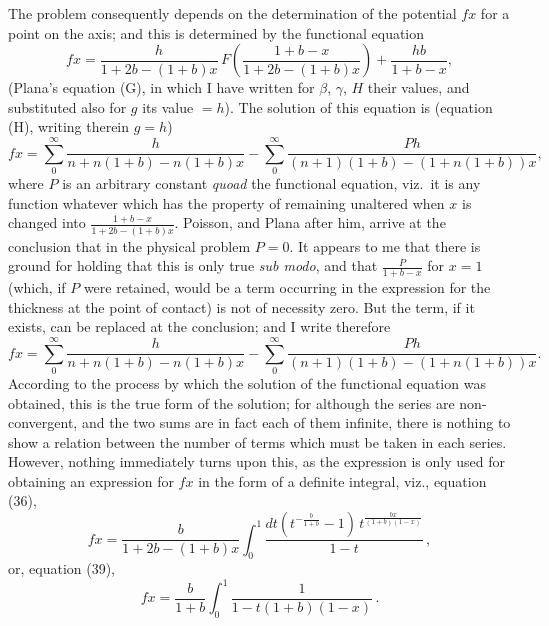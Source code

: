 \documentclass[11pt,a4paper]{article}
\begin{document}
The problem consequently depends on the determination of the potential $fx$ for a point on the axis; and this is determined by the functional equation
\[
fx = \frac{h}{1 + 2b - (1+b)x}\, F\!\left(\frac{1 + b - x}{1 + 2b - (1+b)x}\right) + \frac{hb}{1+b-x},
\]
(Plana's equation (G), in which I have written for $\beta$, $\gamma$, $H$ their values, and substituted also for $g$ its value $= h$). The solution of this equation is (equation (H), writing therein $g = h$)
\[
fx = \sum_{0}^{\infty}\frac{h}{n + n(1+b) - n(1+b)x} - \sum_{0}^{\infty}\frac{Ph}{(n+1)(1+b) - (1 + n(1+b))x},
\]
where $P$ is an arbitrary constant \textit{quoad} the functional equation, viz.\ it is any function whatever which has the property of remaining unaltered when $x$ is changed into $\frac{1+b-x}{1+2b-(1+b)x}$. Poisson, and Plana after him, arrive at the conclusion that in the physical problem $P = 0$. It appears to me that there is ground for holding that this is only true \textit{sub modo}, and that $\frac{P}{1+b-x}$ for $x = 1$ (which, if $P$ were retained, would be a term occurring in the expression for the thickness at the point of contact) is not of necessity zero. But the term, if it exists, can be replaced at the conclusion; and I write therefore
\[
fx = \sum_{0}^{\infty}\frac{h}{n + n(1+b) - n(1+b)x} - \sum_{0}^{\infty}\frac{Ph}{(n+1)(1+b) - (1 + n(1+b))x}.
\]
According to the process by which the solution of the functional equation was obtained, this is the true form of the solution; for although the series are non-convergent, and the two sums are in fact each of them infinite, there is nothing to show a relation between the number of terms which must be taken in each series. However, nothing immediately turns upon this, as the expression is only used for obtaining an expression for $fx$ in the form of a definite integral, viz., equation (36),
\[
fx = \frac{b}{1 + 2b - (1+b)x}\int_{0}^{1}\frac{dt(t^{-\frac{b}{1+b}} - 1)\, t^{\frac{bx}{(1+b)(1-x)}}}{1 - t}\,,
\]
or, equation (39),
\[
fx = \frac{b}{1+b}\int_{0}^{1}\frac{1}{1 - t(1+b)(1-x)}\,.
\]
\end{document}
